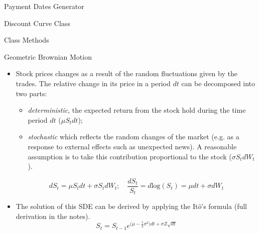 \documentclass{beamer}
\begin{document}
\begin{frame}[fragile]{Payment Dates Generator}
\begin{itemize}
\begin{frame}{Discount Curve Class}
\begin{frame}{Class Methods}
\begin{itemize}
\begin{iptyhon}
\begin{frame}{Geometric Brownian Motion}
\begin{itemize}
\item Stock prices changes as a result of the random fluctuations given by the trades. The relative change in its price in a period $dt$ can be decomposed into two parts:
\begin{itemize}
    \item \emph{deterministic}, the expected return from the stock hold during the time period $dt$ ($\mu S_tdt$);
    \item \emph{stochastic} which reflects the random changes of the market (e.g. as a response to external effects such as unexpected news). A reasonable assumption is to take this contribution proportional to the stock ($\sigma S_t dW_t$).
\end{itemize}
\begin{equation*}
dS_t = \mu S_tdt + \sigma S_tdW_t;\quad\frac{dS_t}{S_t} = d\textrm{log}(S_t) = \mu dt + \sigma dW_t 
\end{equation*}
\item The solution of this SDE can be derived by applying the It$\hat{o}$'s formula (full derivation in the notes).
\begin{equation*}
S_t = S_{t-1}e^{\big(\mu - \frac{1}{2}\sigma^2\big)dt + \sigma Z\sqrt{dt}}
\end{equation*}
\end{itemize}
\end{frame}


\end{iptyhon}
\end{itemize}
\end{frame}
\end{frame}
\end{itemize}
\end{frame}
\end{document}
